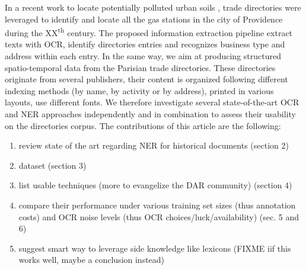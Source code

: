 In a recent work to locate potentially polluted urban soils \cite{bell2020automated}, trade directories were leveraged to identify and locate all the gas stations in the city of Providence during the XX\textsuperscript{th} century.
The proposed information extraction pipeline extract texts with OCR, identify directories entries and recognizes business type and address within each entry.
In the same way, we aim at producing structured spatio-temporal data from the Parisian trade directories.
These directories originate from several publishers, their content is organized following different indexing methods (by name, by activity or by address), printed in various layouts, use different fonts.
We therefore investigate several state-of-the-art OCR and NER approaches independently and in combination to assess their usability on the directories corpus.
The contributions of this article are the following:
\begin{enumerate}
    \item review state of the art regarding NER for historical documents (section 2)
    \item dataset (section 3)
    \item list usable techniques (more to evangelize the DAR community) (section 4)
    \item compare their performance under various training set sizes (thus annotation costs) and OCR noise levels (thus OCR choices/luck/availability) (sec. 5 and 6)
    \item suggest smart way to leverage side knowledge like lexicons (FIXME iif this works well, maybe a conclusion instead) 
\end{enumerate}



